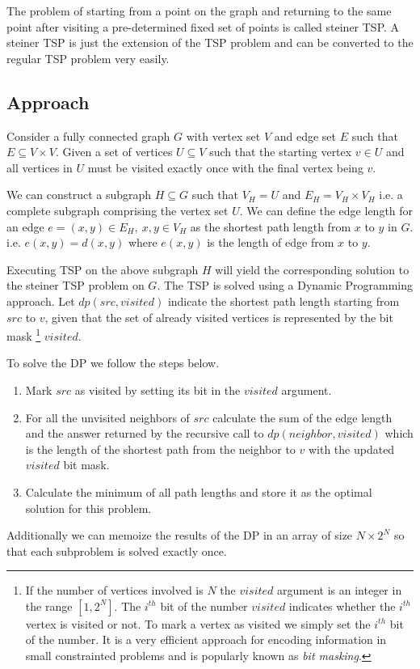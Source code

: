 \documentclass{article}
\begin{document}
The problem of starting from a point on the graph and returning to the same point after visiting a pre-determined fixed
set of points is called steiner TSP. A steiner TSP is just the extension of the TSP problem and can be converted to the
regular TSP problem very easily.

\subsection{Approach}

Consider a fully connected graph $G$ with vertex set $V$ and edge set $E$ such that $E \subseteq V \times V$. 
Given a set of vertices $U \subseteq V$ such that the starting vertex $v \in U$ and all vertices in $U$ must be visited
exactly once with the final vertex being $v$.

We can construct a subgraph $H \subseteq G$ such that $V_H = U$ and $E_H = V_H \times V_H$ i.e. a complete subgraph
comprising the vertex set $U$. We can define the edge length for an edge $e = (x,y) \in E_H,\ x,y \in V_H $ as the shortest
path length from $x$ to $y$ in $G$. i.e. $e(x,y) = d(x,y)$ where $e(x,y)$ is the length of edge from $x$ to $y$.

Executing TSP on the above subgraph $H$ will yield the corresponding solution to the steiner TSP problem on $G$. The TSP is 
solved using a Dynamic Programming approach. Let $dp(src, visited)$ indicate the shortest path length starting from $src$ to 
$v$, given that the set of already visited vertices is represented by the bit mask 
\footnote{
    If the number of vertices involved is $N$ the $visited$ argument is an integer in the range $[1, 2^N]$. The $i^{th}$ bit of
    the number $visited$ indicates whether the $i^{th}$ vertex is visited or not. To mark a vertex as visited we simply set the $i^{th}$
    bit of the number. It is a very efficient approach for encoding information in small constrainted problems and is popularly known as \textit{bit masking}.
}
$visited$.

To solve the DP we follow the steps below.
\begin{enumerate}
    \item Mark $src$ as visited by setting its bit in the $visited$ argument.
    \item For all the unvisited neighbors of $src$ calculate the sum of the edge length and the answer returned by the recursive call to $dp(neighbor, visited)$ which is the length of the shortest path from the neighbor to $v$ with the updated $visited$ bit mask.
    \item Calculate the minimum of all path lengths and store it as the optimal solution for this problem.
\end{enumerate}
Additionally we can memoize the results of the DP in an array of size $N \times 2^N$ so that each subproblem is solved exactly once.
\end{document}
